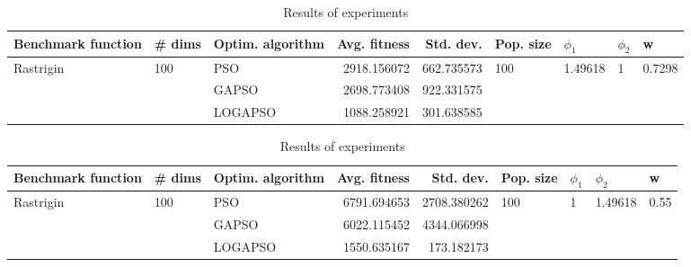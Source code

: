 \documentclass{article}
\begin{document}
\begin{table}
\centering
\caption{Results of experiments}
\begin{tabular}{lllrrllll}
\toprule
        Benchmark function &              \# dims & Optim. algorithm &  Avg. fitness &  Std. dev. &            Pop. size &               $\phi_{1}$ &         $\phi_{2}$ &                       w \\
\midrule
\multirow{3}{*}{Rastrigin} & \multirow{3}{*}{100} &              PSO &   2918.156072 & 662.735573 & \multirow{3}{*}{100} & \multirow{3}{*}{1.49618} & \multirow{3}{*}{1} & \multirow{3}{*}{0.7298} \\
                           &                      &            GAPSO &   2698.773408 & 922.331575 &                      &                          &                    &                         \\
                           &                      &          LOGAPSO &   1088.258921 & 301.638585 &                      &                          &                    &                         \\
\bottomrule
\end{tabular}
\end{table}
\begin{table}
\centering
\caption{Results of experiments}
\begin{tabular}{lllrrllll}
\toprule
        Benchmark function &              \# dims & Optim. algorithm &  Avg. fitness &   Std. dev. &            Pop. size &         $\phi_{1}$ &               $\phi_{2}$ &                     w \\
\midrule
\multirow{3}{*}{Rastrigin} & \multirow{3}{*}{100} &              PSO &   6791.694653 & 2708.380262 & \multirow{3}{*}{100} & \multirow{3}{*}{1} & \multirow{3}{*}{1.49618} & \multirow{3}{*}{0.55} \\
                           &                      &            GAPSO &   6022.115452 & 4344.066998 &                      &                    &                          &                       \\
                           &                      &          LOGAPSO &   1550.635167 &  173.182173 &                      &                    &                          &                       \\
\bottomrule
\end{tabular}
\end{table}
\end{document}
